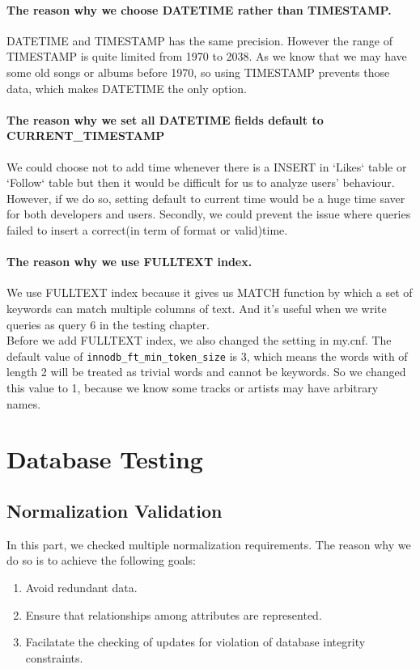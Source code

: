 \documentclass[letterpaper, 12pt]{report}
\begin{document}
	\subsubsection{The reason why we choose DATETIME rather than TIMESTAMP.}
	DATETIME and TIMESTAMP has the same precision. However the range of TIMESTAMP is quite limited from 1970 to 2038. As we know that we may have some old songs or albums before 1970, so using TIMESTAMP prevents those data, which makes DATETIME the only option.
	
	\subsubsection{The reason why we set all DATETIME fields default to CURRENT\_TIMESTAMP}
	We could choose not to add time whenever there is a INSERT in `Likes` table or `Follow` table but then it would be difficult for us to analyze users' behaviour. However, if we do so, setting default to current time would be a huge time saver for both developers and users. Secondly, we could prevent the issue where queries failed to insert a correct(in term of format or valid)time. 
	
	\subsubsection{The reason why we use FULLTEXT index.}
	We use FULLTEXT index because it gives us MATCH function by which a set of keywords can match multiple columns of text. And it's useful when we write queries as query 6 in the testing chapter.\\
	Before we add FULLTEXT index, we also changed the setting in my.cnf. The default value of \texttt{innodb\_ft\_min\_token\_size} is 3, which means the words with of length 2 will be treated as trivial words and cannot be keywords. So we changed this value to 1, because we know some tracks or artists may have arbitrary names.\\
	\chapter{Database Testing}
	
	\section{Normalization Validation}
	In this part, we checked multiple normalization requirements. The reason why we do so is to achieve the following goals:
	\begin{enumerate}
		\item 
		Avoid redundant data.
		\item 
		Ensure that relationships among attributes are represented.
		\item 
		Facilatate the checking of updates for violation of database integrity constraints.
	\end{enumerate}
\end{document}
